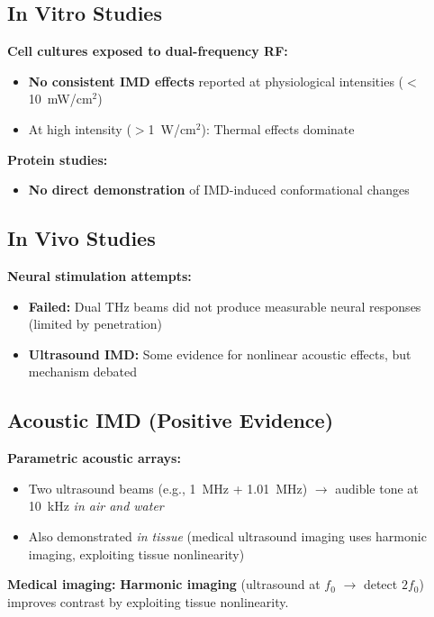 \subsection{In Vitro Studies}

\textbf{Cell cultures exposed to dual-frequency RF:}
\begin{itemize}
\item \textbf{No consistent IMD effects} reported at physiological intensities ($<$10~mW/cm$^2$)
\item At high intensity ($>$1~W/cm$^2$): Thermal effects dominate
\end{itemize}

\textbf{Protein studies:}
\begin{itemize}
\item \textbf{No direct demonstration} of IMD-induced conformational changes
\end{itemize}

\subsection{In Vivo Studies}

\textbf{Neural stimulation attempts:}
\begin{itemize}
\item \textbf{Failed:} Dual THz beams did not produce measurable neural responses (limited by penetration)
\item \textbf{Ultrasound IMD:} Some evidence for nonlinear acoustic effects, but mechanism debated
\end{itemize}

\subsection{Acoustic IMD (Positive Evidence)}

\textbf{Parametric acoustic arrays:}
\begin{itemize}
\item Two ultrasound beams (e.g., 1~MHz + 1.01~MHz) $\rightarrow$ audible tone at 10~kHz \emph{in air and water}
\item Also demonstrated \emph{in tissue} (medical ultrasound imaging uses harmonic imaging, exploiting tissue nonlinearity)
\end{itemize}

\textbf{Medical imaging:} \textbf{Harmonic imaging} (ultrasound at $f_0$ $\rightarrow$ detect $2f_0$) improves contrast by exploiting tissue nonlinearity.

